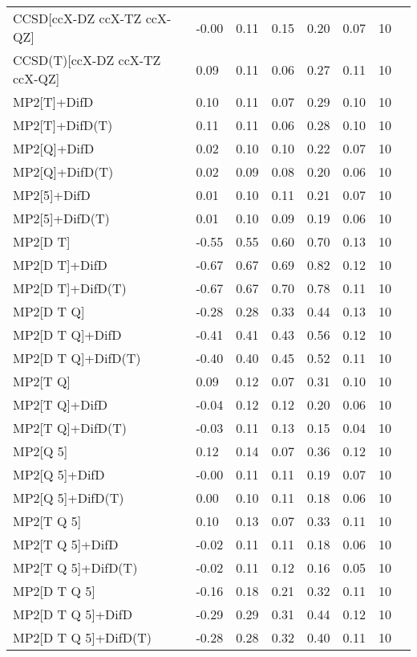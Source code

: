 \begin{table}
\begin{tabular}{l l l l l l l l }
    CCSD[ccX-DZ ccX-TZ ccX-QZ] & -0.00 & 0.11 & 0.15 & 0.20 & 0.07 & 10 \\ 
    CCSD(T)[ccX-DZ ccX-TZ ccX-QZ] & 0.09 & 0.11 & 0.06 & 0.27 & 0.11 & 10 \\ 
    MP2[T]+DifD & 0.10 & 0.11 & 0.07 & 0.29 & 0.10 & 10 \\ 
    MP2[T]+DifD(T) & 0.11 & 0.11 & 0.06 & 0.28 & 0.10 & 10 \\ 
    MP2[Q]+DifD & 0.02 & 0.10 & 0.10 & 0.22 & 0.07 & 10 \\ 
    MP2[Q]+DifD(T) & 0.02 & 0.09 & 0.08 & 0.20 & 0.06 & 10 \\ 
    MP2[5]+DifD & 0.01 & 0.10 & 0.11 & 0.21 & 0.07 & 10 \\ 
    MP2[5]+DifD(T) & 0.01 & 0.10 & 0.09 & 0.19 & 0.06 & 10 \\ 
    MP2[D T] & -0.55 & 0.55 & 0.60 & 0.70 & 0.13 & 10 \\ 
    MP2[D T]+DifD & -0.67 & 0.67 & 0.69 & 0.82 & 0.12 & 10 \\ 
    MP2[D T]+DifD(T) & -0.67 & 0.67 & 0.70 & 0.78 & 0.11 & 10 \\ 
    MP2[D T Q] & -0.28 & 0.28 & 0.33 & 0.44 & 0.13 & 10 \\ 
    MP2[D T Q]+DifD & -0.41 & 0.41 & 0.43 & 0.56 & 0.12 & 10 \\ 
    MP2[D T Q]+DifD(T) & -0.40 & 0.40 & 0.45 & 0.52 & 0.11 & 10 \\ 
    MP2[T Q] & 0.09 & 0.12 & 0.07 & 0.31 & 0.10 & 10 \\ 
    MP2[T Q]+DifD & -0.04 & 0.12 & 0.12 & 0.20 & 0.06 & 10 \\ 
    MP2[T Q]+DifD(T) & -0.03 & 0.11 & 0.13 & 0.15 & 0.04 & 10 \\ 
    MP2[Q 5] & 0.12 & 0.14 & 0.07 & 0.36 & 0.12 & 10 \\ 
    MP2[Q 5]+DifD & -0.00 & 0.11 & 0.11 & 0.19 & 0.07 & 10 \\ 
    MP2[Q 5]+DifD(T) & 0.00 & 0.10 & 0.11 & 0.18 & 0.06 & 10 \\ 
    MP2[T Q 5] & 0.10 & 0.13 & 0.07 & 0.33 & 0.11 & 10 \\ 
    MP2[T Q 5]+DifD & -0.02 & 0.11 & 0.11 & 0.18 & 0.06 & 10 \\ 
    MP2[T Q 5]+DifD(T) & -0.02 & 0.11 & 0.12 & 0.16 & 0.05 & 10 \\ 
    MP2[D T Q 5] & -0.16 & 0.18 & 0.21 & 0.32 & 0.11 & 10 \\ 
    MP2[D T Q 5]+DifD & -0.29 & 0.29 & 0.31 & 0.44 & 0.12 & 10 \\ 
    MP2[D T Q 5]+DifD(T) & -0.28 & 0.28 & 0.32 & 0.40 & 0.11 & 10 \\ 
    \bottomrule
  \end{tabular}
\end{table}
